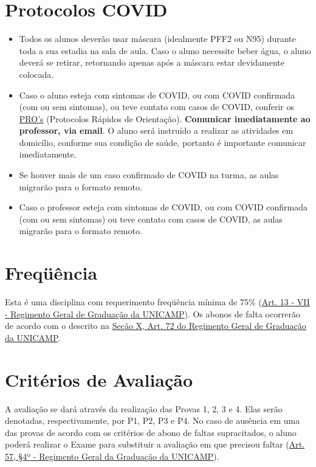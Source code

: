 \documentclass[paper=letter, fontsize=12pt]{scrartcl} %
\begin{document}
\section{Protocolos COVID}

\begin{itemize}

\item Todos os alunos deverão usar máscara (idealmente PFF2 ou N95) durante toda a sua estadia na sala de aula. Caso o aluno necessite beber água, o aluno deverá se retirar, retornando apenas após a máscara estar devidamente colocada.

\item Caso o aluno esteja com sintomas de COVID, ou com COVID confirmada (com ou sem sintomas), ou teve contato com casos de COVID, conferir os \href{https://www.ime.unicamp.br/retomada/pros.html}{PRO's} (Protocolos Rápidos de Orientação). \textbf{Comunicar imediatamente ao professor, via email}. O aluno será instruído a realizar as atividades em domicílio, conforme sua condição de saúde, portanto é importante comunicar imediatamente.

\item Se houver mais de um caso confirmado de COVID na turma, as aulas migrarão para o formato remoto.

\item Caso o professor esteja com sintomas de COVID, ou com COVID confirmada (com ou sem sintomas) ou teve contato com casos de COVID, as aulas migrarão para o formato remoto.

\end{itemize}

\section{Freqüência}

Esta é uma disciplina com requerimento freqüência mínima de 75\% (\href{https://www.dac.unicamp.br/portal/graduacao/regimento-geral}{Art. 13 - VII - Regimento Geral de Graduação da UNICAMP}). Os abonos de falta ocorrerão de acordo com o descrito na \href{https://www.dac.unicamp.br/portal/graduacao/regimento-geral}{Seção X, Art. 72 do Regimento Geral de Graduação da UNICAMP}.

\section{Critérios de Avaliação}

A avaliação se dará através da realização das Provas 1, 2, 3 e 4. Elas serão denotadas, respectivamente, por P1, P2, P3 e P4. No caso de ausência em uma das provas de acordo com os critérios de abono de faltas supracitados, o aluno poderá realizar o Exame para substituir a avaliação em que precisou faltar (\href{https://www.dac.unicamp.br/portal/graduacao/regimento-geral}{Art. 57, §4º - Regimento Geral da Graduação da UNICAMP}).
\end{document}
